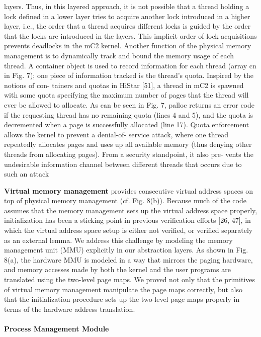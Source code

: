 layers. Thus, in this layered approach, it is not possible that a thread holding a lock defined in a lower layer tries to acquire another lock introduced in a higher layer, i.e., the order that a thread acquires different locks is guided by the order that the locks are introduced in the layers. This implicit order of lock acquisitions prevents deadlocks in the mC2 kernel.
Another function of the physical memory management is to dynamically track and bound the memory usage of each thread. A container object is used to record information for each thread (array cn in Fig. 7); one piece of information tracked is the thread’s quota. Inspired by the notions of con- tainers and quotas in HiStar [51], a thread in mC2 is spawned with some quota specifying the maximum number of pages that the thread will ever be allowed to allocate. As can be seen in Fig. 7, palloc returns an error code if the requesting thread has no remaining quota (lines 4 and 5), and the quota is decremented when a page is successfully allocated (line 17). Quota enforcement allows the kernel to prevent a denial-of- service attack, where one thread repeatedly allocates pages and uses up all available memory (thus denying other threads from allocating pages). From a security standpoint, it also pre- vents the undesirable information channel between different threads that occurs due to such an attack


\textbf{Virtual memory management}
provides consecutive virtual address spaces on top of physical memory management (cf. Fig. 8(b)). Because much of the code assumes that the memory management sets up the virtual address space properly, initialization has been a sticking point in previous verification efforts [26, 47], in which the virtual address space setup is either not verified, or verified separately as an external lemma. We address this challenge by modeling the memory management unit (MMU) explicitly in our abstraction layers. As shown in Fig. 8(a), the hardware MMU is modeled in a way that mirrors the paging hardware, and memory accesses made by both the kernel and the user programs are translated using the two-level page maps. We proved not only that the primitives of virtual memory management manipulate the page maps correctly, but also that the initialization procedure sets up the two-level page maps properly in terms of the hardware address translation.



\paragraph{Process Management Module}

